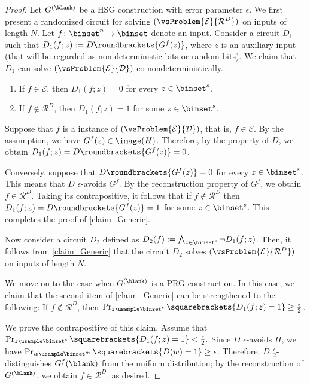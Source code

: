 \documentclass{toc}
\begin{document}
\begin{proof}
  Let $G^{(\blank)}$ be a HSG construction with error parameter $\epsilon$.
  We first present a randomized circuit for solving $(\vsProblem{\mathcal{E}}{\mathcal{R}^D})$
  on inputs of length $N$.
  Let $f \colon \binset^n \to \binset$ denote an input.
  Consider a circuit $D_1$ such that $D_1(f; z) := D\roundbrackets{ G^f(z) }$,
  where $z$ is an auxiliary input (that will be regarded as non-deterministic bits or random bits).
  We claim that $D_1$ can solve $(\vsProblem{\mathcal{E}}{\mathcal{D}})$ co-nondeterministically.
  \begin{claim}
    \label{claim_Generic}
    \hspace{0em}
    \begin{enumerate}
      \item
            If $f \in \mathcal{E}$, then $D_1(f; z) = 0$ for every $z \in \binset^s$.
      \item
            If $f \not\in \mathcal{R}^D$, then $D_1(f; z) = 1$ for some $z \in \binset^s$.
    \end{enumerate}
  \end{claim}
  Suppose that $f$ is a \Yes instance of $(\vsProblem{\mathcal{E}}{\mathcal{D}})$, that is, $f \in \mathcal{E}$.
  By the assumption, we have $G^f(z) \in \image(H)$.
  Therefore, by the property of $D$, we obtain $D_1(f; z) = D\roundbrackets{ G^f(z) } = 0$.

  Conversely, suppose that $D\roundbrackets{ G^f(z) } = 0$ for every $z \in \binset^s$.
  This means that $D$ $\epsilon$-avoids $G^f$.
  By the reconstruction property of $G^f$,
  we obtain $f \in \mathcal{R}^D$.
  Taking its contrapositive, it follows that
  if $f \not\in \mathcal{R}^D$ then $D_1(f; z) = D \roundbrackets{ G^f(z) } = 1$ for some $z \in \binset^s$.
  This completes the proof of \cref{claim_Generic}.

  Now consider a circuit $D_2$ defined as $D_2(f) := \bigwedge_{z \in \binset^s} \neg D_1(f; z)$.
  Then, it follows from \cref{claim_Generic} that the circuit $D_2$ solves $(\vsProblem{\mathcal{E}}{\mathcal{R}^D})$
  on inputs of length $N$.

  We move on to the case when $G^{(\blank)}$ is a PRG construction.
  In this case, we claim that the second item of \cref{claim_Generic} can be strengthened to the following:
  If $f \not\in \mathcal{R}^D$, then $\Pr_{z \usample \binset^s} \squarebrackets{ D_1(f; z) = 1 } \ge \frac{\epsilon}{2}$.

  We prove the contrapositive of this claim.
  Assume that $\Pr_{z \usample \binset^s} \squarebrackets{ D_1(f; z) = 1 } < \frac{\epsilon}{2} .$
  Since $D$ $\epsilon$-avoids $H$, we have $\Pr_{w \usample \binset^m} \squarebrackets{ D(w) = 1 } \ge \epsilon$.
  Therefore, $D$ $\frac{\epsilon}{2}$-distinguishes $G^f(\blank)$ from the uniform distribution;
  by the reconstruction of $G^{(\blank)}$, we obtain $f \in \mathcal{R}^D$, as desired.


\end{proof}
\end{document}
